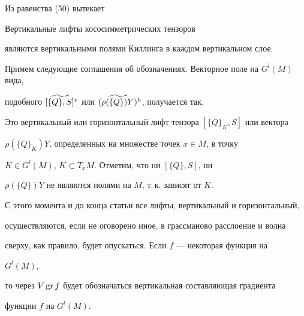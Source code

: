 Из равенства (50) вытекает





\begin{cors} Вертикальные лифты кососимметрических тензоров


являются вертикальными полями Киллинга в каждом вертикальном слое.


\end{cors}







Примем следующие соглашения об обозначениях. Векторное поле на $G^l(M)$ вида,


подобного $\widetilde {[\{Q\},S]}{}^v$ или $\widetilde {(\rho(\{Q\})Y)}{}^h$, получается так.


Это вертикальный или горизонтальный лифт тензора $[\{Q\}_K,S]$ или вектора


$\rho(\{Q\}_K)Y$, определенных на множестве точек $x\in M$, в точку


$K\in G^l(M)$, $K\subset T_xM$. Отметим, что ни $[\{Q\},S]$, ни


$\rho(\{Q\})Y$ не являются полями на $M$, т.\,к. зависят от $K$.




С этого момента и до конца статьи все лифты, вертикальный и горизонтальный,


осуществляются, если не оговорено иное, в грассманово расслоение и волна


сверху, как правило, будет опускаться. Если $f$ --- некоторая функция на


$G^l(M)$,


то через $V\operatorname{gr} f$ будет обозначаться вертикальная составляющая градиента


функции $f$ на $G^l(M)$.





